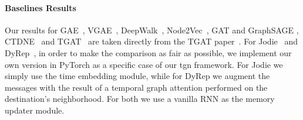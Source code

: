\documentclass{article}
\begin{document}
\paragraph{Baselines Results}
Our results for GAE~\citep{kipf2016variational}, VGAE~\citep{kipf2016variational}, DeepWalk~\citep{10.1145/2623330.2623732},  Node2Vec~\citep{10.1145/2939672.2939754}, GAT \citep{DBLP:conf/iclr/VelickovicCCRLB18} and GraphSAGE \citep{hamilton2017representation}, CTDNE~\citep{10.1145/3184558.3191526} and TGAT~\citep{Xu2020Inductive} are taken directly from the TGAT paper~\citep{Xu2020Inductive}. For Jodie~\citep{10.1145/3292500.3330895} and DyRep~\citep{trivedi2018dyrep}, in order to make the comparison as fair as possible, we implement our own version in PyTorch as a specific case of our tgn framework. For Jodie we simply use the time embedding module, while for DyRep we augment the messages with the result of a temporal graph attention performed on the destination's neighborhood. For both we use a vanilla RNN as the memory updater module.



\end{document}
